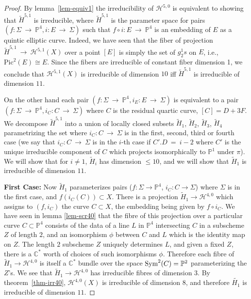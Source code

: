 \documentclass[twoside,12pt,reqno]{amsart}
\theoremstyle{plain}
\theoremstyle{definition}
\newcommand{\Hdg}[2]{\mathcal{H}^{#1,#2}}
\newcommand{\CC}{\mathbb{C}}
\newcommand{\PP}{\mathbb{P}}
\def\Sym{{\rm Sym}}
\def\ps{\vspace{4pt}}
\begin{document}
\begin{proof}
By lemma~\ref{lem-equiv1} the irreducibility of $\Hdg{5}{0}$ is equivalent 
to showing that
$\widetilde{H}^{5,1}$ is irreducible, where
$\widetilde{H}^{5,1}$ is the parameter space for pairs
$(f:\Sigma~\rightarrow~ \PP^4, i:E~\rightarrow~ \Sigma)$ such that $f\circ
i:E~\rightarrow~ \PP^4$ is an embedding of $E$ as a quintic elliptic
curve.  Indeed, we have seen that the fiber of projection
$\widetilde{H}^{5,1} ~\rightarrow~ \Hdg{5}{1}(X)$ over a point $[E]$
is simply the set of $g^1_2s$ 
on $E$, i.e., $\text{Pic}^2(E) \cong E$.  Since the fibers are
irreducible of constant fiber dimension 1, we conclude that $\Hdg{5}{1}(X)$
is irreducible of dimension $10$ iff $\widetilde{H}^{5,1}$ is
irreducible of dimension $11$.  

\ps

On the other hand each pair $(f:\Sigma~\rightarrow~
\PP^4,i_E:E~\rightarrow~\Sigma)$ is equivalent to a pair
$(f:\Sigma~\rightarrow~ \PP^4, i_C:C~\rightarrow~ \Sigma)$ where 
$C$ is the residual quartic curve, $[C]=D+3F$.  
We decompose $\widetilde{H}^{5,1}$ into
a union of locally closed subsets
$\widetilde{H}_1$, $\widetilde{H}_2$, $\widetilde{H}_3$, $\widetilde{H}_4$
parametrizing the 
set where $i_C:C~\rightarrow~ \Sigma$ is in the first, second, third or
fourth case (we say that $i_C:C~\rightarrow~ \Sigma$ is in the $i$-th case
if $C'.D ~=~ i-2$ where $C'$ is the unique irreducible component of $C$
which projects isomorphically to $\PP^1$ under $\pi$).  We will show that
for $i\neq 1$, $\widetilde{H}_i$ has dimension $\leq 10$, and we will
show that $\widetilde{H}_1$ is irreducible of dimension $11$.  

\ps

\textbf{First Case:}
Now $\widetilde{H}_1$ parameterizes pairs ($f:\Sigma\rightarrow\PP^4$,
$i_C:C\rightarrow\Sigma$) where $\Sigma$ is in the first case, and
$f(i_C(C))\subset X$.  There is a projection $\widetilde{H}_1 \rightarrow
\Hdg{4}{0}$ which assigns to $(f,i_C)$ the curve $C\subset X$, the
embedding being given by 
$f\circ i_C$.  We have seen in lemma \ref{lem-scr40} that the fibre 
of this projection over a particular curve $C\subset \PP^4$ consists of
the data of a line $L$ in $\PP^4$ intersecting $C$ in a subscheme $Z$ of
length $2$, and an isomorphism $\phi$ between $C$ and $L$ which is the
identity map on $Z$.  The length $2$ subscheme $Z$ uniquely determines
$L$, and given a fixed $Z$, there is a $\CC^{*}$ worth of choices of 
such isomorphisms $\phi$.  Therefore each fibre of $\widetilde{H}_1
\rightarrow\Hdg{4}{0}$ is itself a $\CC^{*}$ bundle over the space
$\Sym^2(C)=\PP^2$ parameterizing the $Z$'s.  We see that $\widetilde{H}_1
\rightarrow \Hdg{4}{0}$ has irreducible fibres of dimension $3$.  
By theorem~\ref{thm-irr40},  $\Hdg{4}{0}(X)$ is irreducible of dimension $8$,
and therefore $\widetilde{H_1}$ is irreducible of dimension $11$.



\end{proof}
\end{document}
